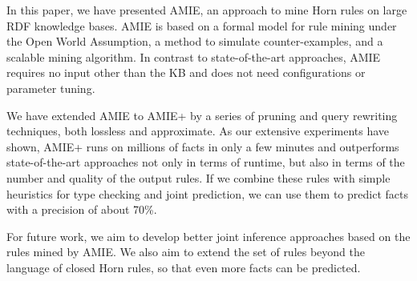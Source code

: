 
In this paper, we have presented AMIE, an approach to mine Horn rules on large RDF knowledge bases. AMIE is based on a formal model for rule mining under the Open World Assumption, a method to simulate counter-examples, and a scalable mining algorithm. In contrast to state-of-the-art approaches, AMIE requires no input other than the KB and does not need configurations or parameter tuning.

We have extended AMIE to AMIE+ by a series of pruning and query rewriting techniques, both lossless and approximate.
As our extensive experiments have shown, AMIE+ runs on millions of facts in only a few minutes and outperforms state-of-the-art approaches not only in terms of runtime,
but also in terms of the number and quality of the output rules.
If we combine these rules with simple heuristics for type checking and joint prediction, we can use them to predict facts with a precision of about 70\%.

For future work, we aim to develop better joint inference approaches based on the rules mined by AMIE. We also aim to
extend the set of rules beyond the language of closed Horn rules,
so that even more facts can be predicted.

